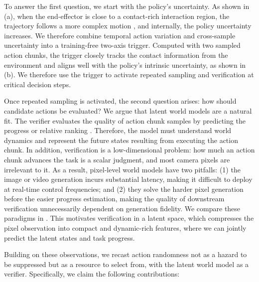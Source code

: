 \documentclass[10pt,twocolumn,letterpaper]{article}
\begin{document}
To answer the first question, we start with the policy's uncertainty. As shown in (a), when the end-effector is close to a contact-rich interaction region, the trajectory follows a more complex motion \cite{pang2023globalplanningcontactrichmanipulation}, and internally, the policy uncertainty increases. We therefore combine temporal action variation and cross-sample uncertainty into a training-free two-axis trigger. Computed with two sampled action chunks, the trigger closely tracks the contact information from the environment and aligns well with the policy's intrinsic uncertainty, as shown in (b). We therefore use the trigger to activate repeated sampling and verification at critical decision steps.

Once repeated sampling is activated, the second question arises: how should candidate actions be evaluated? We argue that latent world models are a natural fit. The verifier evaluates the quality of action chunk samples by predicting the progress or relative ranking \cite{kwok2025robomonkeyscalingtesttimesampling, fan2026dreamavoidcriticalphasetesttimedreaming}. Therefore, the model must understand world dynamics and represent the future states resulting from executing the action chunk.
In addition, verification is a low-dimensional problem: how much an action chunk advances the task is a scalar judgment, and most camera pixels are irrelevant to it. As a result, pixel-level world models have two pitfalls: (1) the image or video generation incurs substantial latency, making it difficult to deploy at real-time control frequencies; and (2) they solve the harder pixel generation before the easier progress estimation, making the quality of downstream verification unnecessarily dependent on generation fidelity. We compare these paradigms in . This motivates verification in a latent space, which compresses the pixel observation into compact and dynamic-rich features, where we can jointly predict the latent states and task progress.


Building on these observations, we recast action randomness not as a hazard to be suppressed but as a resource to select from, with the latent world model as a verifier. Specifically, we claim the following contributions:
\end{document}

